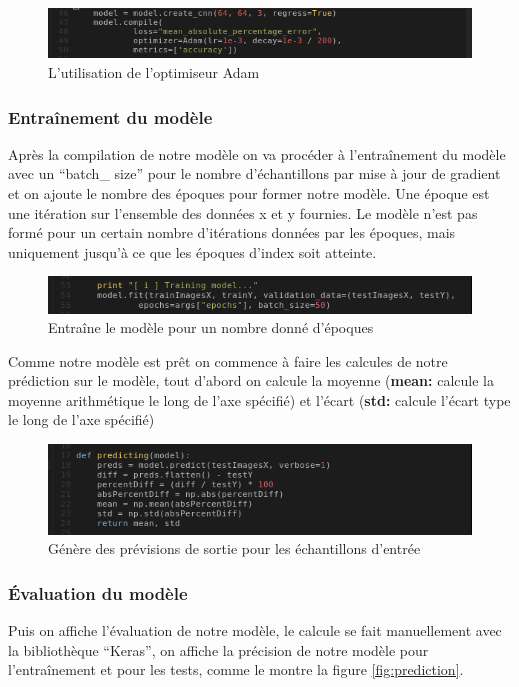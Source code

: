 \documentclass[12pt]{article}
\begin{document}
\begin{figure}[h]
	\centering
	\includegraphics[width=15cm]{img-Chapiter-4/training.png}
	\caption{L'utilisation de l'optimiseur Adam}
\end{figure}

\subsubsection*{Entraînement du modèle}
Après la compilation de notre modèle on va procéder à l’entraînement du modèle avec un “batch\_ size” pour le nombre d'échantillons par mise à jour de gradient et on ajoute le nombre des époques pour former notre modèle. Une époque est une itération sur l'ensemble des données x et y fournies. Le modèle n'est pas formé pour un certain nombre d'itérations données par les époques, mais uniquement jusqu'à ce que les époques d'index soit atteinte.
\newpage
\begin{figure}[h]
	\centering
	\includegraphics[width=15cm]{img-Chapiter-4/train.png}
	\caption{Entraîne le modèle pour un nombre donné d'époques}
\end{figure}

Comme notre modèle est prêt on commence à faire les calcules de notre prédiction sur le modèle, tout d'abord on calcule la moyenne (\textbf{mean:} calcule la moyenne arithmétique le long de l'axe spécifié) et l’écart (\textbf{std:} calcule l'écart type le long de l'axe spécifié)

\begin{figure}[h]
	\centering
	\includegraphics[width=15cm]{img-Chapiter-4/predecting.png}
	\caption{Génère des prévisions de sortie pour les échantillons d'entrée}
\end{figure}

\subsubsection*{Évaluation du modèle}
Puis on affiche l’évaluation de notre modèle, le calcule se fait manuellement avec la bibliothèque “Keras”, on affiche la précision de notre modèle pour l’entraînement et pour les tests, comme le montre la figure \ref{fig:prediction}.
\end{document}
